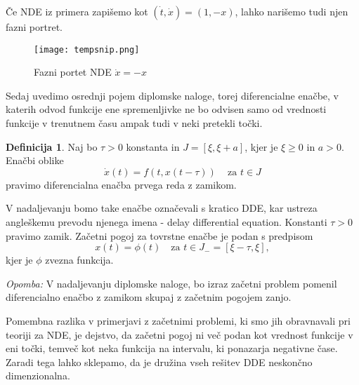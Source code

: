 \documentclass[12pt,a4paper]{amsart}
\theoremstyle{definition} %
\newtheorem{definicija}{Definicija}[section]
\theoremstyle{plain} %
\begin{document}
Če NDE iz primera zapišemo kot $(\dot{t},\dot{x})=(1,-x)$,
lahko narišemo tudi njen fazni portret.
\begin{figure}[h]
    \texttt{[image: tempsnip.png]}
    \caption{Fazni portet NDE $\dot{x} = -x$}
\end{figure}


\newpage

Sedaj uvedimo osrednji pojem diplomske naloge, torej diferencialne enačbe, v 
katerih odvod funkcije ene spremenljivke ne bo odvisen samo od vrednosti funkcije
v trenutnem času ampak tudi v neki pretekli točki. 

\begin{definicija}
    Naj bo $\tau > 0$ konstanta in $J = [\xi,\xi +a]$, kjer je $\xi \geq 0$ in $a > 0$. Enačbi oblike
    \[\dot{x}(t)=f(t,x(t-\tau))\, \quad \text{za } t \in J\]
    pravimo diferencialna enačba prvega reda z zamikom.
\end{definicija}

\noindent V nadaljevanju bomo take enačbe
označevali s kratico DDE, kar ustreza angleškemu prevodu njenega imena - 
delay dif\mbox{}ferential equation. Konstanti $\tau>0$ pravimo zamik.
Začetni pogoj za tovrstne enačbe je podan s predpisom
\[x(t)=\phi(t) \quad \text{za } t \in J_{-} = [\xi-\tau,\xi],\]kjer je $\phi$ zvezna funkcija.

\textit{Opomba:} V nadaljevanju diplomske naloge, bo izraz začetni problem pomenil diferencialno enačbo z
zamikom skupaj z začetnim pogojem zanjo.

Pomembna razlika v primerjavi z začetnimi problemi, ki smo jih obravnavali pri teoriji za NDE, je 
dejstvo, da začetni pogoj ni več podan kot vrednost 
funkcije v eni točki, temveč kot neka funkcija na intervalu, ki ponazarja negativne čase. 
Zaradi tega lahko sklepamo, da je družina vseh rešitev DDE neskončno
dimenzionalna.
\end{document}
